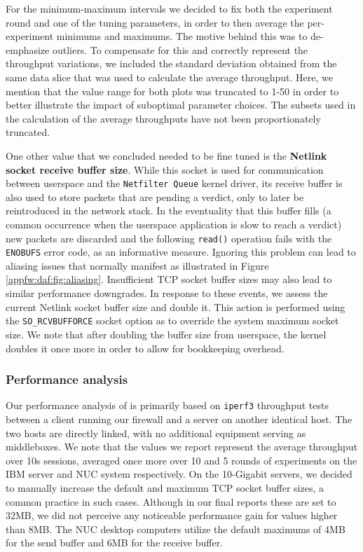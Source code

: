 For the minimum-maximum intervals we decided to fix both the experiment round and one of the tuning parameters, in order to then average the per-experiment minimums and maximums. The motive behind this was to de-emphasize outliers. To compensate for this and correctly represent the throughput variations, we included the standard deviation obtained from the same data slice that was used to calculate the average throughput. Here, we mention that the value range for both plots was truncated to 1-50 in order to better illustrate the impact of suboptimal parameter choices. The subsets used in the calculation of the average throughputs have not been proportionately truncated.



One other value that we concluded needed to be fine tuned is the \textbf{Netlink socket receive buffer size}. While this socket is used for communication between userspace and the \texttt{Netfilter Queue} kernel driver, its receive buffer is also used to store packets that are pending a verdict, only to later be reintroduced in the network stack. In the eventuality that this buffer fills (a common occurrence when the userspace application is slow to reach a verdict) new packets are discarded and the following \texttt{read()} operation fails with the \texttt{ENOBUFS} error code, as an informative measure. Ignoring this problem can lead to aliasing issues that normally manifest as illustrated in Figure \ref{appfw:daf:fig:aliasing}. Insufficient TCP socket buffer sizes may also lead to similar performance downgrades. In response to these events, we assess the current Netlink socket buffer size and double it. This action is performed using the \texttt{SO\_RCVBUFFORCE} socket option as to override the system maximum socket size. We note that after doubling the buffer size from userspace, the kernel doubles it once more in order to allow for bookkeeping overhead.


\subsubsection{Performance analysis}

Our performance analysis of \daf{} is primarily based on \texttt{iperf3} throughput tests between a client running our firewall and a server on another identical host. The two hosts are directly linked, with no additional equipment serving as middleboxes. We note that the values we report represent the average throughput over 10s sessions, averaged once more over 10 and 5 rounds of experiments on the IBM server and NUC system respectively. On the 10-Gigabit servers, we decided to manually increase the default and maximum TCP socket buffer sizes, a common practice in such cases. Although in our final reports these are set to 32MB, we did not perceive any noticeable performance gain for values higher than 8MB. The NUC desktop computers utilize the default maximums of 4MB for the send buffer and 6MB for the receive buffer.

